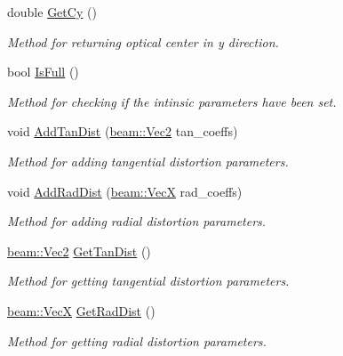 \begin{DoxyCompactItemize}
double \hyperlink{classbeam__calibration_1_1_pinhole_a7fcb0a42c56369c920f56251c6451b59}{Get\+Cy} ()
\begin{DoxyCompactList}\small\item\em Method for returning optical center in y direction. \end{DoxyCompactList}\item 
bool \hyperlink{classbeam__calibration_1_1_pinhole_a326e7bb0ae15aea808d7f11c6c706869}{Is\+Full} ()
\begin{DoxyCompactList}\small\item\em Method for checking if the intinsic parameters have been set. \end{DoxyCompactList}\item 
void \hyperlink{classbeam__calibration_1_1_pinhole_a6d0bc4ac42aeb376a7138065b8ca7ade}{Add\+Tan\+Dist} (\hyperlink{group__utils_ga6112bda54e53755ab14060144285c6b0}{beam\+::\+Vec2} tan\+\_\+coeffs)
\begin{DoxyCompactList}\small\item\em Method for adding tangential distortion parameters. \end{DoxyCompactList}\item 
void \hyperlink{classbeam__calibration_1_1_pinhole_a6bc5e220a93ea3a2b398c5bb443e49d0}{Add\+Rad\+Dist} (\hyperlink{group__utils_gae5ba967e4b0d4b421ca30ef46f896145}{beam\+::\+VecX} rad\+\_\+coeffs)
\begin{DoxyCompactList}\small\item\em Method for adding radial distortion parameters. \end{DoxyCompactList}\item 
\hyperlink{group__utils_ga6112bda54e53755ab14060144285c6b0}{beam\+::\+Vec2} \hyperlink{classbeam__calibration_1_1_pinhole_aee136039482aed25893c2ab37b5c00aa}{Get\+Tan\+Dist} ()
\begin{DoxyCompactList}\small\item\em Method for getting tangential distortion parameters. \end{DoxyCompactList}\item 
\hyperlink{group__utils_gae5ba967e4b0d4b421ca30ef46f896145}{beam\+::\+VecX} \hyperlink{classbeam__calibration_1_1_pinhole_ac455a6e6c46e7dafa14eac53042723d2}{Get\+Rad\+Dist} ()
\begin{DoxyCompactList}\small\item\em Method for getting radial distortion parameters. \end{DoxyCompactList}\item 

\end{DoxyCompactItemize}
